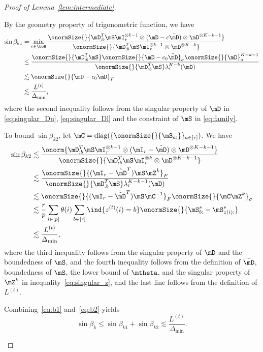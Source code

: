 \documentclass[lettersize,onecolumn,journal]{IEEEtran}
\theoremstyle{definition}
\theoremstyle{definition}
\def\fixme#1#2{\textbf{\color{red}[FIXME (#1): #2]}}
\begin{document}
\begin{proof}[Proof of Lemma~\ref{lem:intermediate}]
\begin{enumerate}[wide]
    By the geometry property of trigonometric function, we have
    \begin{align}\label{eq:b1}
        \sin \beta_{k1} &= \min_{c \in \bbR} \frac{\onormSize{}{\mD_{:b}^{T} \mS \mI_r^{\otimes k-1} \otimes (\mD - c \tilde \mD) \otimes \mD^{\otimes K-k - 1} } }{ \onormSize{}{\mD_{:b}^{T} \mS \mI_r^{\otimes k-1} \otimes \mD^{\otimes K-k}} }\\
        &\leq \frac{ \onormSize{}{\mD_{:b}^{T} \mS} \onormSize{}{\mD - c_0 \tilde \mD}_{\sigma} \onormSize{}{\mD}_{\sigma}^{K-k-1} }{\onormSize{}{\mD_{:b}^{T} \mS} \lambda_r^{K-k}(\mD) }\\
        & \lesssim  \onormSize{}{\mD - c_0 \tilde \mD}_{F}\\
        & \lesssim \frac{L^{(t)}}{\Delta_{\min}},
    \end{align}
    where the second inequality follows from the singular property of $\mD$ in \eqref{eq:singular_Du}, \eqref{eq:singular_Dl} and the constraint of $\mS$ in \eqref{eq:family}.
    
    To bound $\sin \beta_{k2}$, let $\mC = \text{diag}(\{\onormSize{}{\mS_{a:}}\}_{a \in [r]})$. We have 
    \begin{align}\label{eq:b2}
        \sin \beta_{k2} &\lesssim \frac{ \onorm{\mD_{:b}^{T} \mS \mI_r^{\otimes k-1} \otimes (\mI_r - \tilde \mD) \otimes \mD^{\otimes K-k-1} } }{\onormSize{}{\mD_{:b}^{T} \mS \mI_r^{\otimes k} \otimes \mD^{\otimes K-k-1} }  }\\
        & \lesssim \frac{ \onormSize{}{(\mI_r - \tilde \mD^T) \mS \mZ^k}_F }{\onormSize{}{\mD_{:b}^{T} \mS} \lambda_r^{K-k-1}(\mD)} \\
        & \lesssim \onormSize{ }{(\mI_r - \tilde \mD^T) \mS \mC^{-1}}_F \onormSize{}{\mC \mZ^k}_{\sigma}\\
        & \lesssim \frac{r}{p} \sum_{i \in [p]} \theta(i) \sum_{b \in [r]} \ind\{z^{(t)}(i) = b\} \onormSize{}{\mS_{b:}^s - \mS_{z(i):}^s} \\
        & \lesssim \frac{L^{(t)}}{\Delta_{\min}}, %
    \end{align}
    where the third inequality follows from the singular property of $\mD$ and the boundedness of $\mS$, and the fourth inequality follows from the definition of $\tilde \mD$, boundedness of $\mS$, the lower bound of $\mtheta$, and the singular property of $\mZ^k$ in inequality~\eqref{eq:singular_z}, and the last line follows from the definition of $L^{(t)}$.
    
  Combining~\eqref{eq:b1} and~\eqref{eq:b2} yields
    \begin{equation}
        \sin \beta_k \leq \sin \beta_{k1} + \sin \beta_{k2} \lesssim \frac{L^{(t)}}{\Delta_{\min}}.
    \end{equation}


\end{enumerate}
\end{proof}
\end{document}
